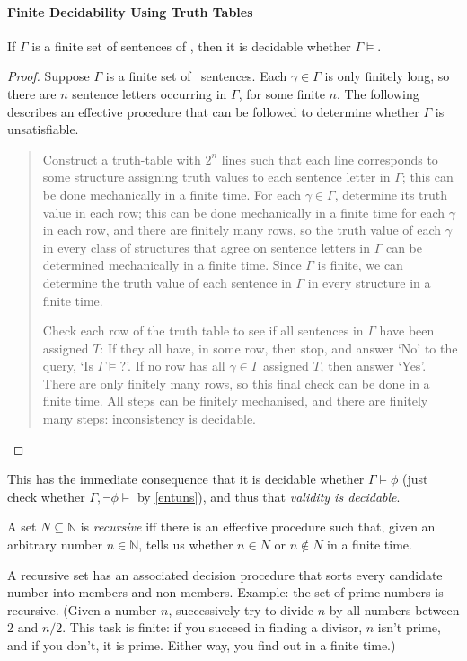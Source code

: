\paragraph{Finite Decidability Using Truth Tables}
\begin{theorem}\label{findec}
	If $\Gamma$ is a finite set of sentences of \lone, then it is decidable whether $\Gamma \vDash$.
	\begin{proof}
Suppose $\Gamma$ is a finite set of \lone\ sentences. Each $\gamma\in\Gamma$ is only finitely long, so there are $n$ sentence letters occurring in $\Gamma$, for some finite $n$. The following describes an effective procedure that can be followed to determine whether $\Gamma$ is unsatisfiable. \begin{quote}
	Construct a truth-table with $2^{n}$ lines such that each line corresponds to some structure assigning truth values to each sentence letter in $\Gamma$; this can be done mechanically in a finite time. For each $\gamma \in \Gamma$, determine its truth value in each row; this can be done mechanically in a finite time for each $\gamma$ in each row, and there are finitely many rows, so the truth value of each $\gamma$ in every class of structures that agree on sentence letters in $\Gamma$ can be determined mechanically in a finite time. Since $\Gamma$ is finite, we can determine the truth value of each sentence in $\Gamma$ in every structure in a finite time. 

	Check each row of the truth table to see if all sentences in $\Gamma$ have been assigned $T$: If they all have, in some row, then stop, and answer `No' to the query, `Is $\Gamma\vDash$?'. If no row has all $\gamma\in\Gamma$ assigned $T$, then answer `Yes'. There are only finitely many rows, so this final check can be done in a finite time. All steps can be finitely mechanised, and there are finitely many steps: inconsistency is decidable.
		\end{quote}
	\end{proof}
\end{theorem}

This has the immediate consequence that it is decidable whether $\Gamma\vDash\phi$ (just check whether $\Gamma,\neg\phi\vDash$ by \autoref{entuns}), and thus that \emph{validity is decidable}.

\begin{definition}[Recursivity]
	A set $N \subseteq \mathbb{N}$ is \emph{recursive} iff there is an effective procedure such that, given an arbitrary number $n \in \mathbb{N}$, tells us whether $n\in N$ or $n\notin N$ in a finite time. 
\end{definition} A recursive set has an associated decision procedure that sorts every candidate number into members and non-members. Example: the set of prime numbers is recursive. (Given a number $n$, successively try to divide $n$ by all numbers between 2 and $n/2$. This task is finite: if you succeed in finding a divisor, $n$ isn't prime, and if you don't, it is prime. Either way, you find out in a finite time.)


